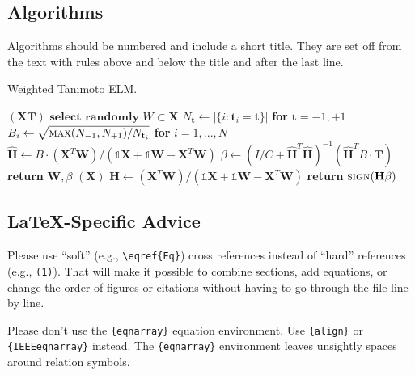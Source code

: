 \documentclass[journal,twoside,web]{ieeecolor}
\begin{document}
\subsection{Algorithms}
Algorithms should be numbered and include a short title.
They are set off from the text with rules above and below the title and after the last line.
\begin{algorithm}[H]
\caption{Weighted Tanimoto ELM.}\label{alg:alg1}
\begin{algorithmic}
\STATE 
{}$(\mathbf{X} \mathbf{T})$
\STATE \hspace{0.5cm}$ \textbf{select randomly } W \subset \mathbf{X}  $
\STATE \hspace{0.5cm}$ N_\mathbf{t} \gets | \{ i : \mathbf{t}_i = \mathbf{t} \} | $ \textbf{ for } $ \mathbf{t}= -1,+1 $
\STATE \hspace{0.5cm}$ B_i \gets \sqrt{ \textsc{max}(N_{-1},N_{+1}) / N_{\mathbf{t}_i} } $ \textbf{ for } $ i = 1,...,N $
\STATE \hspace{0.5cm}$ \hat{\mathbf{H}} \gets  B \cdot (\mathbf{X}^T\textbf{W})/( \mathbb{1}\mathbf{X} + \mathbb{1}\textbf{W} - \mathbf{X}^T\textbf{W} ) $
\STATE \hspace{0.5cm}$ \beta \gets \left ( I/C + \hat{\mathbf{H}}^T\hat{\mathbf{H}} \right )^{-1}(\hat{\mathbf{H}}^T B\cdot \mathbf{T})  $
\STATE \hspace{0.5cm}\textbf{return} $\textbf{W},  \beta $
\STATE 
{}$(\mathbf{X} )$
\STATE \hspace{0.5cm}$ \mathbf{H} \gets  (\mathbf{X}^T\textbf{W} )/( \mathbb{1}\mathbf{X}  + \mathbb{1}\textbf{W}- \mathbf{X}^T\textbf{W}  ) $
\STATE \hspace{0.5cm}\textbf{return}  $\textsc{sign}( \mathbf{H} \beta )$
\end{algorithmic}
\label{alg1}
\end{algorithm}
\subsection{\LaTeX-Specific Advice}

Please use ``soft'' (e.g., \verb|\eqref{Eq}|) cross references instead
of ``hard'' references (e.g., \verb|(1)|). That will make it possible
to combine sections, add equations, or change the order of figures or
citations without having to go through the file line by line.

Please don't use the \verb|{eqnarray}| equation environment. Use
\verb|{align}| or \verb|{IEEEeqnarray}| instead. The \verb|{eqnarray}|
environment leaves unsightly spaces around relation symbols.
\end{document}
